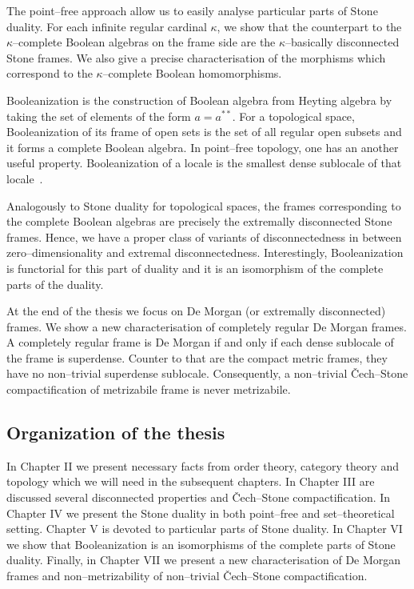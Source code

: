 The point--free approach allow us to easily analyse particular parts of Stone duality.
For each infinite regular cardinal $\kappa$, we show that the counterpart to the $\kappa$--complete Boolean algebras on the frame side are the $\kappa$--basically disconnected Stone frames.
We also give a precise characterisation of the morphisms which correspond to the $\kappa$--complete Boolean homomorphisms.

Booleanization is the construction of Boolean algebra from Heyting algebra by taking the set of elements of the form $a = a^{**}$.
For a topological space, Booleanization of its frame of open sets is the set of all regular open subsets and it forms a complete Boolean algebra.
In point--free topology, one has an another useful property.
Booleanization of a locale is the smallest dense sublocale of that locale~\cite{banaschewski1996booleanization}.

Analogously to Stone duality for topological spaces, the frames corresponding to the complete Boolean algebras are precisely the extremally disconnected Stone frames.
Hence, we have a proper class of variants of disconnectedness in between zero--dimensionality and extremal disconnectedness. %
Interestingly, Booleanization is functorial for this part of duality and it is an isomorphism of the complete parts of the duality.

At the end of the thesis we focus on De Morgan (or extremally disconnected) frames.
We show a new characterisation of completely regular De Morgan frames.
A completely regular frame is De Morgan if and only if each dense sublocale of the frame is superdense.
Counter to that are the compact metric frames, they have no non--trivial superdense sublocale.
Consequently, a non--trivial \v{C}ech--Stone compactification of metrizabile frame is never metrizabile.


\subsection*{Organization of the thesis}

In Chapter II we present necessary facts from order theory, category theory and topology which we will need in the subsequent chapters.
In Chapter III are discussed several disconnected properties and \v{C}ech--Stone compactification. %
In Chapter IV we present the Stone duality in both point--free and set--theoretical setting.
Chapter V is devoted to particular parts of Stone duality.
In Chapter VI we show that Booleanization is an isomorphisms of the complete parts of Stone duality.
Finally, in Chapter VII we present a new characterisation of De Morgan frames and non--metrizability of non--trivial \v{C}ech--Stone compactification.

